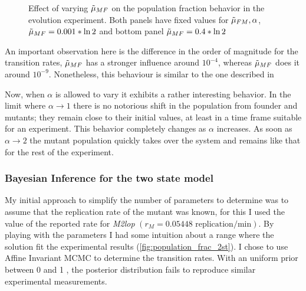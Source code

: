 \documentclass{article}
\begin{document}
\begin{figure}
\begin{subfigure}[b]{0.4\textwidth}
    \end{subfigure}
    \caption{Effect of varying $\Tilde{\mu}_{MF}$ on the population fraction behavior in the evolution experiment. Both panels have fixed values for $\Tilde{\mu}_{FM}, \alpha$, $\Tilde{\mu}_{MF} = 0.001 * \ln{2}$ and bottom panel $\Tilde{\mu}_{MF} = 0.4 * \ln{2}$ }
    \label{fig:effect_of_varying_mu_mf}
\end{figure}

An important observation here is the difference in the order of magnitude for the transition rates,   $\Tilde{\mu}_{MF}$ has a stronger influence around $10^{-4}$, whereas $\Tilde{\mu}_{MF}$ does it around $10^{-9}$. Nonetheless, this behaviour is similar to the one described in \cite{reams_duplication_2010}

Now, when $\alpha$ is allowed to vary it exhibits a rather interesting behavior. In the limit where $\alpha \rightarrow 1$ there is no notorious shift in the population from founder and mutants; they remain close to their initial values, at least in a time frame suitable for an experiment. This behavior completely changes as $\alpha$ increases. As soon as $\alpha  \rightarrow 2$ the mutant population quickly takes over the system and remains like that for the rest of the experiment.

\subsubsection{Bayesian Inference for the two state model}
My initial approach to simplify the number of parameters to determine was to assume that the replication rate of the mutant was known, for this I used the value of the reported rate for \textit{M2lop} $(r_M = 0.05448 \text{ replication/min})$. By playing with the parameters I had some intuition about a range where the solution fit the experimental results (\ref{fig:population_frac_2st}). I chose to use Affine Invariant MCMC to determine the transition rates. With an uniform prior between 0 and 1 , the posterior distribution fails to reproduce similar experimental measurements.
\end{document}
